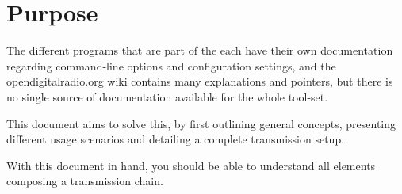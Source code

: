 \section{Purpose}
The different programs that are part of the \mmbtools each have their own
documentation regarding command-line options and configuration settings, and the
opendigitalradio.org wiki contains many explanations and pointers, but there is
no single source of documentation available for the whole tool-set.

This document aims to solve this, by first outlining general concepts,
presenting different usage scenarios and detailing a complete transmission
setup.

With this document in hand, you should be able to understand all elements
composing a \mmbtools transmission chain.

